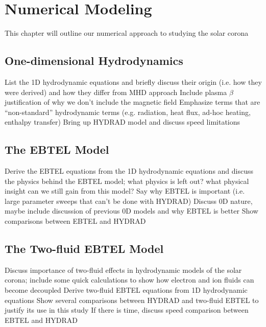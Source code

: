 \chapter{Numerical Modeling}
\label{ch:numerical}
This chapter will outline our numerical approach to studying the solar corona
\section{One-dimensional Hydrodynamics}
\label{sec:1dhydro}
List the 1D hydrodynamic equations and briefly discuss their origin (i.e. how they were derived) and how they differ from MHD approach
Include plasma $\beta$ justification of why we don't include the magnetic field
Emphasize terms that are ``non-standard'' hydrodynamic terms (e.g. radiation, heat flux, ad-hoc heating, enthalpy transfer)
Bring up HYDRAD model and discuss speed limitations
\section{The EBTEL Model}
\label{sec:ebtel}
Derive the EBTEL equations from the 1D hydrodynamic equations and discuss the physics behind the EBTEL model; what physics is left out? what physical insight can we still gain from this model?
Say why EBTEL is important (i.e. large parameter sweeps that can't be done with HYDRAD)
Discuss 0D nature, maybe include discussion of previous 0D models and why EBTEL is better
Show comparisons between EBTEL and HYDRAD
\section{The Two-fluid EBTEL Model}
\label{sec:ebtel2fl}
Discuss importance of two-fluid effects in hydrodynamic models of the solar corona; include some quick calculations to show how electron and ion fluids can become decoupled
Derive two-fluid EBTEL equations from 1D hydrodynamic equations
Show several comparisons between HYDRAD and two-fluid EBTEL to justify its use in this study
If there is time, discuss speed comparison between EBTEL and HYDRAD